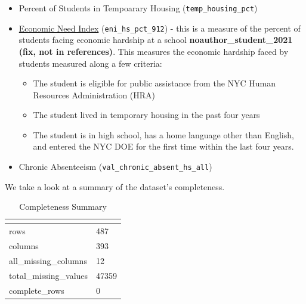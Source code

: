 \documentclass[
  man,floatsintext]{apa6}
\providecommand{\tightlist}{%
  \setlength{\itemsep}{0pt}\setlength{\parskip}{0pt}}
\begin{document}
\begin{itemize}
\tightlist
\item
  Percent of Students in Tempoarary Housing (\texttt{temp\_housing\_pct})
\item
  \href{https://data.cccnewyork.org/data/bar/1371/student-economic-need-index\#1371/a/1/1622/127}{Economic Need Index} (\texttt{eni\_hs\_pct\_912}) - this is a measure of the percent of students facing economic hardship at a school \textbf{noauthor\_student\_2021 (fix, not in references)}. This measures the economic hardship faced by students measured along a few criteria:

  \begin{itemize}
  \tightlist
  \item
    The student is eligible for public assistance from the NYC Human Resources Administration (HRA)
  \item
    The student lived in temporary housing in the past four years
  \item
    The student is in high school, has a home language other than English, and entered the NYC DOE for the first time within the last four years.
  \end{itemize}
\item
  Chronic Absenteeism (\texttt{val\_chronic\_absent\_hs\_all})
\end{itemize}

We take a look at a summary of the dataset's completeness.

\begin{table}[H]

\begin{center}
\begin{threeparttable}

\caption{\label{tab:data2}Completeness Summary}

\begin{tabular}{ll}
\toprule
 & \multicolumn{1}{c}{}\\
\midrule
rows & 487\\
columns & 393\\
all\_missing\_columns & 12\\
total\_missing\_values & 47359\\
complete\_rows & 0\\
\bottomrule
\end{tabular}

\end{threeparttable}
\end{center}

\end{table}
\end{document}
